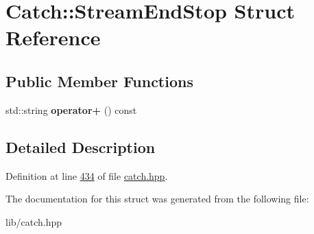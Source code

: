 \hypertarget{structCatch_1_1StreamEndStop}{}\section{Catch\+::Stream\+End\+Stop Struct Reference}
\label{structCatch_1_1StreamEndStop}
\subsection*{Public Member Functions}
\begin{DoxyCompactItemize}
\item 
\mbox{\label{structCatch_1_1StreamEndStop_a4a518f0342a381074821d5bda2651401}} 
std\+::string {\bfseries operator+} () const
\end{DoxyCompactItemize}


\subsection{Detailed Description}


Definition at line \mbox{\hyperlink{catch_8hpp_source_l00434}{434}} of file \mbox{\hyperlink{catch_8hpp_source}{catch.\+hpp}}.



The documentation for this struct was generated from the following file\+:\begin{DoxyCompactItemize}
\item 
lib/catch.\+hpp\end{DoxyCompactItemize}
